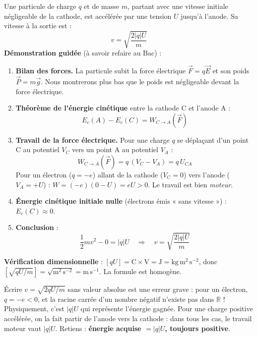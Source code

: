 \documentclass[11pt]{article}
\begin{document}
\begin{propriete}
Une particule de charge $q$ et de masse $m$, partant avec une vitesse initiale négligeable de la cathode, est accélérée par une tension $U$ jusqu'à l'anode. Sa vitesse à la sortie est :
\[ \boxed{\; v = \sqrt{\frac{2|q|U}{m}} \;} \]
\textbf{Démonstration guidée} (à savoir refaire au Bac) :
\begin{enumerate}
\item \textbf{Bilan des forces.} La particule subit la force électrique $\vec{F} = q\vec{E}$ et son poids $\vec{P} = m\vec{g}$. Nous montrerons plus bas que le poids est négligeable devant la force électrique.
\item \textbf{Théorème de l'énergie cinétique} entre la cathode C et l'anode A :
\[ E_c(A) - E_c(C) = W_{C\to A}(\vec{F}) \]
\item \textbf{Travail de la force électrique.} Pour une charge $q$ se déplaçant d'un point C au potentiel $V_C$ vers un point A au potentiel $V_A$ :
\[ W_{C\to A}(\vec{F}) = q\,(V_C - V_A) = q\,U_{CA} \]
Pour un électron ($q = -e$) allant de la cathode ($V_C = 0$) vers l'anode ($V_A = +U$) : $W = (-e)(0 - U) = eU > 0$. Le travail est bien \emph{moteur}.
\item \textbf{Énergie cinétique initiale nulle} (électrons émis « sans vitesse ») : $E_c(C) \approx 0$.
\item \textbf{Conclusion} :
\[ \frac{1}{2}mv^2 - 0 = |q|U \quad\Longrightarrow\quad v = \sqrt{\frac{2|q|U}{m}} \]
\end{enumerate}
\textbf{Vérification dimensionnelle} : $[qU] = \mathrm{C \times V} = \mathrm{J} = \mathrm{kg\,m^2\,s^{-2}}$, donc $\left[\sqrt{qU/m}\right] = \sqrt{\mathrm{m^2\,s^{-2}}} = \mathrm{m\,s^{-1}}$. La formule est homogène.
\end{propriete}

\begin{attention}
Écrire $v = \sqrt{2qU/m}$ sans valeur absolue est une erreur grave : pour un électron, $q = -e < 0$, et la racine carrée d'un nombre négatif n'existe pas dans $\mathbb{R}$ ! Physiquement, c'est $|q|U$ qui représente l'énergie gagnée. Pour une charge positive accélérée, on la fait partir de l'anode vers la cathode : dans tous les cas, le travail moteur vaut $|q|U$. Retiens : \textbf{énergie acquise $= |q|U$, toujours positive}.
\end{attention}
\end{document}
